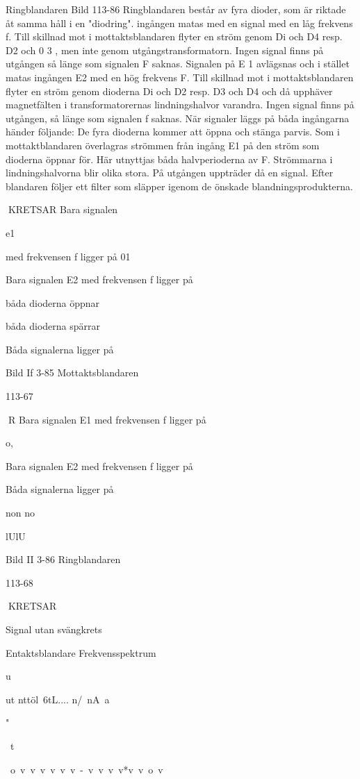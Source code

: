\documentclass[a4paper,twoside,twocolumn,openright]{book}
\begin{document}
{{{{Ringblandaren
Bild 113-86
Ringblandaren består av fyra dioder, som är
riktade åt samma håll i en "diodring".
ingången
matas med en signal med en
låg frekvens f. Till skillnad mot i mottaktsblandaren flyter en ström genom Di och D4
resp. D2 och 0 3 , men inte genom utgångstransformatorn. Ingen signal finns på utgången så länge som signalen F saknas.
Signalen på E 1 avlägsnas och i stället
matas ingången E2 med en hög frekvens F.
Till skillnad mot i mottaktsblandaren flyter en
ström genom dioderna Di och D2 resp. D3
och D4 och då upphäver magnetfälten i
transformatorernas lindningshalvor varandra. Ingen signal finns på utgången, så länge
som signalen f saknas.
När signaler läggs på båda ingångarna
händer följande:
De fyra dioderna kommer att öppna och
stänga parvis. Som i mottaktblandaren överlagras strömmen från ingång E1 på den
ström som dioderna öppnar för.
Här utnyttjas båda halvperioderna av F.
Strömmarna i lindningshalvorna blir olika
stora. På utgången uppträder då en signal.
Efter blandaren följer ett filter som släpper
igenom de önskade blandningsprodukterna.

KRETSAR
Bara signalen

e1

med frekvensen f ligger på
01

Bara signalen E2 med frekvensen f ligger på

båda dioderna öppnar

båda dioderna spärrar

Båda signalerna ligger på

Bild If 3-85 Mottaktsblandaren

113-67

R
Bara signalen E1 med frekvensen f ligger på

o,

Bara signalen E2 med frekvensen f ligger på

Båda signalerna ligger på

non no

lUlU

Bild II 3-86 Ringblandaren

113-68

KRETSAR

Signal utan svängkrets

Entaktsblandare
Frekvensspektrum

u

ut
nttöl\ 6tL.... n/\ nA~a

"

~t

~o~v~v~v~v~v~v~-~v~v\ v~v*v~v~o~v~~

}}}}
\end{document}
